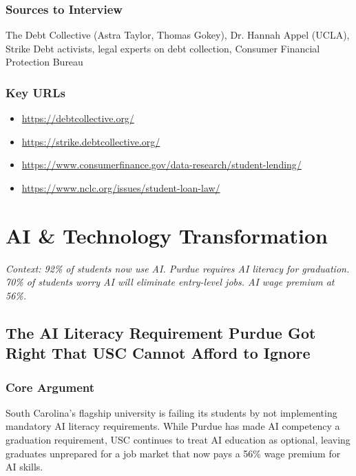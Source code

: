 \documentclass[11pt,letterpaper]{article}
\begin{document}
\subsubsection*{Sources to Interview}
The Debt Collective (Astra Taylor, Thomas Gokey), Dr. Hannah Appel (UCLA), Strike Debt activists, legal experts on debt collection, Consumer Financial Protection Bureau

\subsubsection*{Key URLs}
\begin{itemize}[noitemsep]
    \item \url{https://debtcollective.org/}
    \item \url{https://strike.debtcollective.org/}
    \item \url{https://www.consumerfinance.gov/data-research/student-lending/}
    \item \url{https://www.nclc.org/issues/student-loan-law/}
\end{itemize}

\newpage
\section{AI \& Technology Transformation}

\textit{Context: 92\% of students now use AI. Purdue requires AI literacy for graduation. 70\% of students worry AI will eliminate entry-level jobs. AI wage premium at 56\%.}

\newpage
\subsection{The AI Literacy Requirement Purdue Got Right That USC Cannot Afford to Ignore}

\subsubsection*{Core Argument}
South Carolina's flagship university is failing its students by not implementing mandatory AI literacy requirements. While Purdue has made AI competency a graduation requirement, USC continues to treat AI education as optional, leaving graduates unprepared for a job market that now pays a 56\% wage premium for AI skills.
\end{document}
